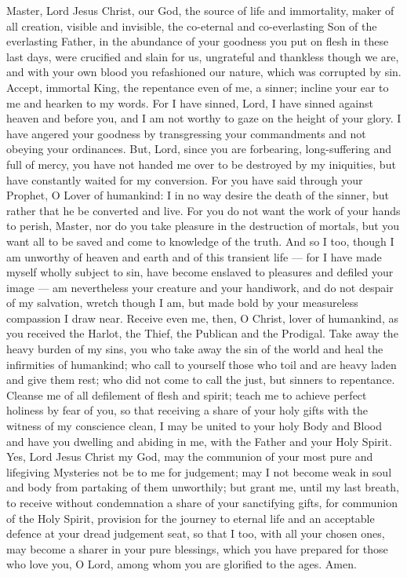Master, Lord Jesus Christ, our God, the source of life and immortality, maker of all creation, visible and invisible, the co-eternal and co-everlasting Son of the everlasting Father, in the abundance of your goodness you put on flesh in these last days, were crucified and slain for us, ungrateful and thankless though we are, and with your own blood you refashioned our nature, which was corrupted by sin. Accept, immortal King, the repentance even of me, a sinner; incline your ear to me and hearken to my words. For I have sinned, Lord, I have sinned against heaven and before you, and I am not worthy to gaze on the height of your glory. I have angered your goodness by transgressing your commandments and not obeying your ordinances. But, Lord, since you are forbearing, long-suffering and full of mercy, you have not handed me over to be destroyed by my iniquities, but have constantly waited for my conversion. For you have said through your Prophet, O Lover of humankind: I in no way desire the death of the sinner, but rather that he be converted and live. For you do not want the work of your hands to perish, Master, nor do you take pleasure in the destruction of mortals, but you want all to be saved and come to knowledge of the truth. And so I too, though I am unworthy of heaven and earth and of this transient life --- for I have made myself wholly subject to sin, have become enslaved to pleasures and defiled your image --- am nevertheless your creature and your handiwork, and do not despair of my salvation, wretch though I am, but made bold by your measureless compassion I draw near. Receive even me, then, O Christ, lover of humankind, as you received the Harlot, the Thief, the Publican and the Prodigal. Take away the heavy burden of my sins, you who take away the sin of the world and heal the infirmities of humankind; who call to yourself those who toil and are heavy laden and give them rest; who did not come to call the just, but sinners to repentance. Cleanse me of all defilement of flesh and spirit; teach me to achieve perfect holiness by fear of you, so that receiving a share of your holy gifts with the witness of my conscience clean, I may be united to your holy Body and Blood and have you dwelling and abiding in me, with the Father and your Holy Spirit. Yes, Lord Jesus Christ my God, may the communion of your most pure and lifegiving Mysteries not be to me for judgement; may I not become weak in soul and body from partaking of them unworthily; but grant me, until my last breath, to receive without condemnation a share of your sanctifying gifts, for communion of the Holy Spirit, provision for the journey to eternal life and an acceptable defence at your dread judgement seat, so that I too, with all your chosen ones, may become a sharer in your pure blessings, which you have prepared for those who love you, O Lord, among whom you are glorified to the ages. Amen.

